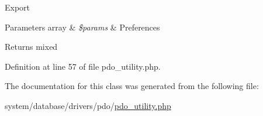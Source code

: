 Export


\begin{DoxyParams}[1]{Parameters}
array & {\em \$params} & Preferences \\
\hline
\end{DoxyParams}
\begin{DoxyReturn}{Returns}
mixed 
\end{DoxyReturn}


Definition at line 57 of file pdo\+\_\+utility.\+php.



The documentation for this class was generated from the following file\+:\begin{DoxyCompactItemize}
\item 
system/database/drivers/pdo/\mbox{\hyperlink{pdo__utility_8php}{pdo\+\_\+utility.\+php}}\end{DoxyCompactItemize}
